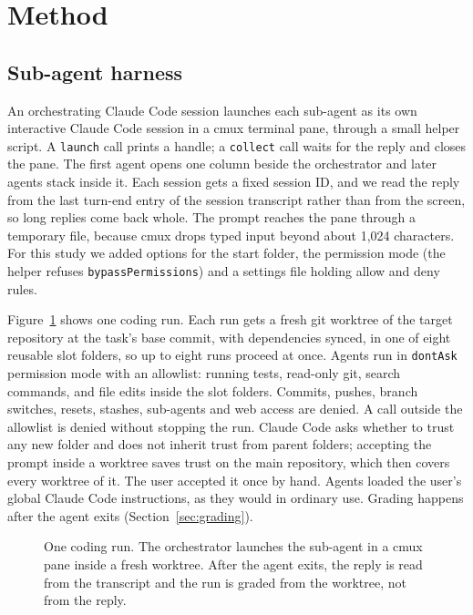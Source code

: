 \section{Method}
\label{sec:method}

\subsection{Sub-agent harness}
\label{sec:harness}

An orchestrating Claude Code session launches each sub-agent as its own
interactive Claude Code session in a cmux terminal pane, through a small
helper script. A \texttt{launch} call prints a handle; a \texttt{collect}
call waits for the reply and closes the pane. The first agent opens one
column beside the orchestrator and later agents stack inside it. Each
session gets a fixed session ID, and we read the reply from the last
turn-end entry of the session transcript rather than from the screen, so
long replies come back whole. The prompt reaches the pane through a
temporary file, because cmux drops typed input beyond about 1,024
characters. For this study we added options for the start folder, the
permission mode (the helper refuses \texttt{bypassPermissions}) and a
settings file holding allow and deny rules.

Figure~\ref{fig:pipeline} shows one coding run. Each run gets a fresh
git worktree of the target repository at the task's base commit, with
dependencies synced, in one of eight reusable slot folders, so up to eight
runs proceed at once. Agents run in \texttt{dontAsk} permission mode with
an allowlist: running tests, read-only git, search commands, and file
edits inside the slot folders. Commits, pushes, branch switches, resets,
stashes, sub-agents and web access are denied. A call outside the
allowlist is denied without stopping the run. Claude Code asks whether to
trust any new folder and does not inherit trust from parent folders;
accepting the prompt inside a worktree saves trust on the main repository,
which then covers every worktree of it. The user accepted it once by hand.
Agents loaded the user's global Claude Code instructions, as they would in
ordinary use. Grading happens after the agent exits (Section~\ref{sec:grading}).

\begin{figure}[H]
\centering

\caption{One coding run. The orchestrator launches the sub-agent in a
cmux pane inside a fresh worktree. After the agent exits, the reply is
read from the transcript and the run is graded from the worktree, not
from the reply.}
\label{fig:pipeline}
\end{figure}

